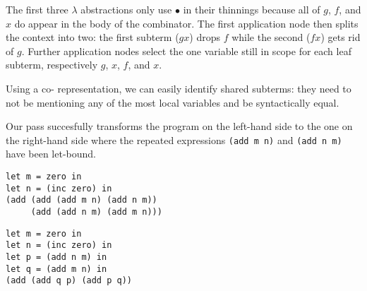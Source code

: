 \codebruijnexamplegraph{}

The first three $\lambda$ abstractions only use $\bullet$ in their thinnings
because all of $g$, $f$, and $x$ do appear in the body of the combinator.
%
The first application node then splits the context into two: the first subterm
($g x$) drops $f$ while the second ($f x$) gets rid of $g$.
%
Further application nodes select the one variable still in scope for each
leaf subterm, respectively $g$, $x$, $f$, and $x$.

Using a co-\DeBruijn{} representation, we can easily identify shared subterms:
they need to not be mentioning any of the most local variables and be
syntactically equal.


Our pass succesfully transforms the program on the left-hand side to the
one on the right-hand side where the repeated expressions
\texttt{(add m n)} and \texttt{(add n m)} have been let-bound.

\begin{minipage}[t]{0.4\textwidth}
\begin{Verbatim}
let m = zero in
let n = (inc zero) in
(add (add (add m n) (add n m))
     (add (add n m) (add m n)))
\end{Verbatim}
\end{minipage}\hfill\begin{minipage}[t]{0.4\textwidth}
\begin{Verbatim}
let m = zero in
let n = (inc zero) in
let p = (add n m) in
let q = (add m n) in
(add (add q p) (add p q))
\end{Verbatim}
\end{minipage}
